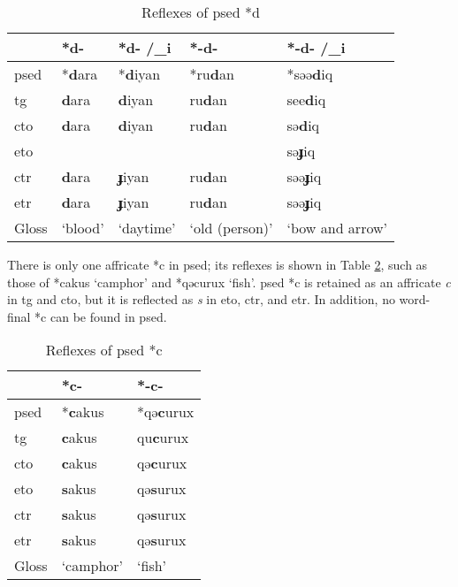 \begin{table}[!htbp]
\centering
\caption{Reflexes of \acl{psed} *d}
\label{tab:psed_d}
\begin{tabular}{lllll}
\hline
           & *d-     & *d- /\_i  & *-d-           & *-d- /\_i       \\ \hline
\acs{psed} & *\textbf{d}ara   & *\textbf{d}iyan    & *ru\textbf{d}an         & *səə\textbf{d}iq           \\ \hdashline
\acs{tg}   & \textbf{d}ara    & \textbf{d}iyan     & ru\textbf{d}an          & see\textbf{d}iq            \\
\acs{cto}  & \textbf{d}ara    & \textbf{d}iyan     & ru\textbf{d}an          & sə\textbf{d}iq            \\
 \acs{eto}  &         &           &                & sə\textbf{ɟ}iq                \\
\acs{ctr}  & \textbf{d}ara    & \textbf{ɟ}iyan     & ru\textbf{d}an          & səə\textbf{ɟ}iq            \\
\acs{etr}  & \textbf{d}ara    & \textbf{ɟ}iyan     & ru\textbf{d}an          & səə\textbf{ɟ}iq            \\ \hline
Gloss      & `blood' & `daytime' & `old (person)' & `bow and arrow' \\ \hline
\end{tabular}
\end{table}

There is only one affricate *c in \acl{psed}; its reflexes is shown in Table \ref{tab:psed_c}, such as those of *cakus `camphor' and *qəcurux `fish'. \acl{psed} *c is retained as an affricate \textit{c} in \acl{tg} and \acl{cto}, but it is reflected as \textit{s} in \acl{eto}, \acl{ctr}, and \acl{etr}. In addition, no word-final *c can be found in \acl{psed}.

\begin{table}[!htbp]
\centering
\caption{Reflexes of \acl{psed} *c}
\label{tab:psed_c}
\begin{tabular}{lll}
\hline
           & *c-       & *-c-   \\ \hline
\acs{psed} & *\textbf{c}akus    & *qə\textbf{c}urux \\ \hdashline
\acs{tg}   & \textbf{c}akus     & qu\textbf{c}urux  \\
\acs{cto}  & \textbf{c}akus     & qə\textbf{c}urux  \\
\acs{eto}  & \textbf{s}akus     & qə\textbf{s}urux       \\
\acs{ctr}  & \textbf{s}akus     & qə\textbf{s}urux  \\
\acs{etr}  & \textbf{s}akus     & qə\textbf{s}urux  \\ \hline
Gloss      & `camphor' & `fish' \\ \hline
\end{tabular}
\end{table}

